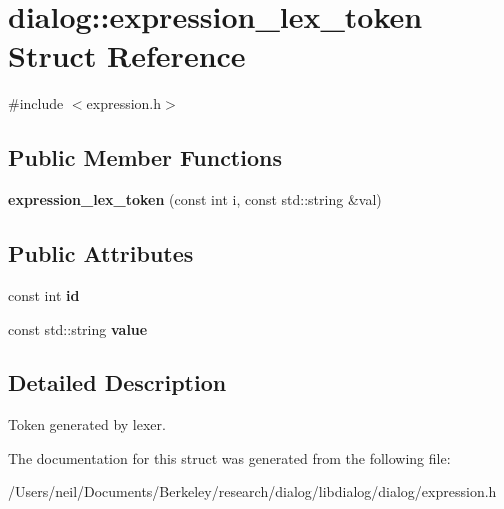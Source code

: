 \hypertarget{structdialog_1_1expression__lex__token}{}\section{dialog\+:\+:expression\+\_\+lex\+\_\+token Struct Reference}
\label{structdialog_1_1expression__lex__token}


{\ttfamily \#include $<$expression.\+h$>$}

\subsection*{Public Member Functions}
\begin{DoxyCompactItemize}
\item 
\mbox{\label{structdialog_1_1expression__lex__token_aac6ebd20c98fd48fd86f232448976570}} 
{\bfseries expression\+\_\+lex\+\_\+token} (const int i, const std\+::string \&val)
\end{DoxyCompactItemize}
\subsection*{Public Attributes}
\begin{DoxyCompactItemize}
\item 
\mbox{\label{structdialog_1_1expression__lex__token_a2bfc13d1160ec976f2476d828636581a}} 
const int {\bfseries id}
\item 
\mbox{\label{structdialog_1_1expression__lex__token_aefc12495fa2e870b10a8fc38c6bf5ef7}} 
const std\+::string {\bfseries value}
\end{DoxyCompactItemize}


\subsection{Detailed Description}
Token generated by lexer. 

The documentation for this struct was generated from the following file\+:\begin{DoxyCompactItemize}
\item 
/\+Users/neil/\+Documents/\+Berkeley/research/dialog/libdialog/dialog/expression.\+h\end{DoxyCompactItemize}
